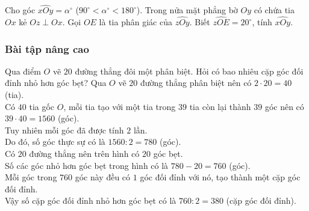 \begin{bt}%
Cho góc $\widehat{xOy}=\alpha ^{\circ}$ ($90^{\circ}<\alpha ^{\circ}<180^{\circ}$). Trong nửa mặt phẳng bờ $Oy$ có chứa tia $Ox$ kẻ $Oz \perp Ox$. Gọi $OE$ là tia phân giác của $\widehat{zOy}$. Biết $\widehat{zOE}=20^{\circ}$, tính $\widehat{xOy}$.
\loigiai
{
}
\end{bt}

\subsubsection{Bài tập nâng cao}

\begin{bt}%
Qua điểm $O$ vẽ $20$ đường thẳng đôi một phân biệt. Hỏi có bao nhiêu cặp góc đối đỉnh nhỏ hơn góc bẹt?
\loigiai
{
Qua $O$ vẽ $20$ đường thẳng phân biệt nên có $2 \cdot 20=40$ (tia).\\
Có $40$ tia gốc $O$, mỗi tia tạo với một tia trong $39$ tia còn lại thành $39$ góc nên có $39 \cdot 40=1560$ (góc).\\
Tuy nhiên mỗi góc đã được tính $2$ lần.\\
Do đó, số góc thực sự có là $1560 : 2=780$ (góc).\\
Có $20$ đường thẳng nên trên hình có $20$ góc bẹt.\\
Số các góc nhỏ hơn góc bẹt trong hình có là $780-20=760$ (góc).\\
Mỗi góc trong $760$ góc này đều có $1$ góc đối đỉnh với nó, tạo thành một cặp góc đối đỉnh.\\
Vậy số cặp góc đối đỉnh nhỏ hơn góc bẹt có là $760:2=380$ (cặp góc đối đỉnh).
}
\end{bt}

